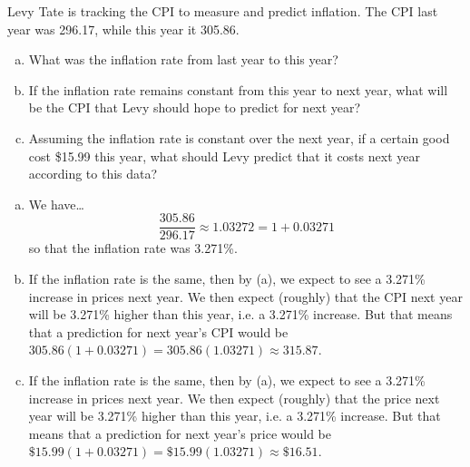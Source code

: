 \documentclass[11pt,letterpaper]{article}
\begin{document}

 Levy Tate is tracking the CPI to measure and predict inflation. The CPI last year was 296.17, while this year it 305.86. 
	\begin{enumerate}[(a)]
	\item What was the inflation rate from last year to this year?
	\item If the inflation rate remains constant from this year to next year, what will be the CPI that Levy should hope to predict for next year?
	\item Assuming the inflation rate is constant over the next year, if a certain good cost \$15.99 this year, what should Levy predict that it costs next year according to this data?
	\end{enumerate} \pspace

\sol
\begin{enumerate}[(a)]
\item We have\dots
	\[
	\dfrac{305.86}{296.17} \approx 1.03272= 1 + 0.03271
	\] \pspace
so that the inflation rate was 3.271\%. \pspace

\item If the inflation rate is the same, then by (a), we expect to see a 3.271\% increase in prices next year. We then expect (roughly) that the CPI next year will be 3.271\% higher than this year, i.e. a 3.271\% increase. But that means that a prediction for next year's CPI would be $305.86(1 + 0.03271)= 305.86(1.03271) \approx 315.87$. \pspace

\item If the inflation rate is the same, then by (a), we expect to see a 3.271\% increase in prices next year. We then expect (roughly) that the price next year will be 3.271\% higher than this year, i.e. a 3.271\% increase. But that means that a prediction for next year's price would be $\$15.99(1 + 0.03271)= \$15.99(1.03271) \approx \$16.51$. 
\end{enumerate}



\newpage
\end{document}
